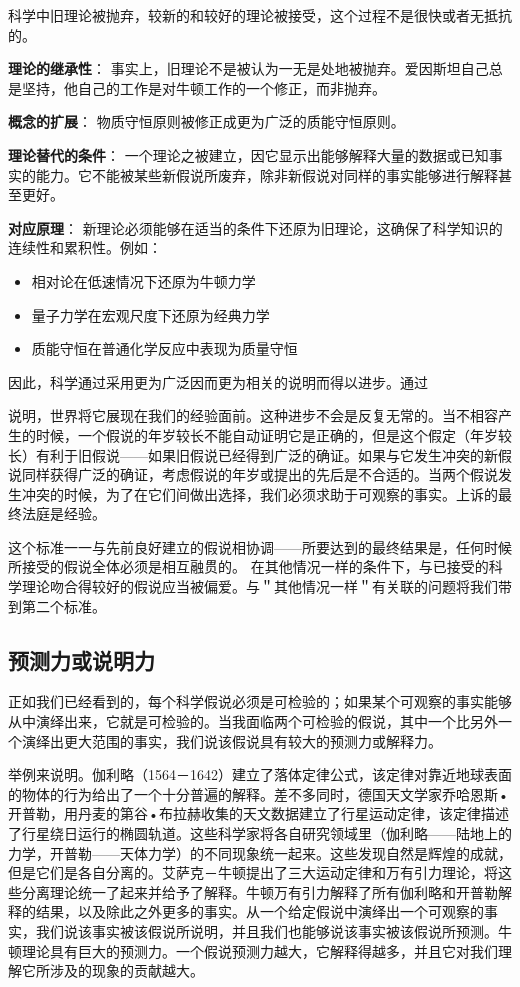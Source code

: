 \begin{theorembox}[title=理论继承与发展的辩证关系]
科学中旧理论被抛弃，较新的和较好的理论被接受，这个过程不是很快或者无抵抗的。

\textbf{理论的继承性}：
事实上，旧理论不是被认为一无是处地被抛弃。爱因斯坦自己总是坚持，他自己的工作是对牛顿工作的一个修正，而非抛弃。

\textbf{概念的扩展}：
物质守恒原则被修正成更为广泛的质能守恒原则。

\textbf{理论替代的条件}：
一个理论之被建立，因它显示出能够解释大量的数据或已知事实的能力。它不能被某些新假说所废弃，除非新假说对同样的事实能够进行解释甚至更好。

\textbf{对应原理}：
新理论必须能够在适当的条件下还原为旧理论，这确保了科学知识的连续性和累积性。例如：
\begin{itemize}
\item 相对论在低速情况下还原为牛顿力学
\item 量子力学在宏观尺度下还原为经典力学
\item 质能守恒在普通化学反应中表现为质量守恒
\end{itemize}
\end{theorembox}

因此，科学通过采用更为广泛因而更为相关的说明而得以进步。通过

说明，世界将它展现在我们的经验面前。这种进步不会是反复无常的。当不相容产生的时候，一个假说的年岁较长不能自动证明它是正确的，但是这个假定（年岁较长）有利于旧假说——如果旧假说已经得到广泛的确证。如果与它发生冲突的新假说同样获得广泛的确证，考虑假说的年岁或提出的先后是不合适的。当两个假说发生冲突的时候，为了在它们间做出选择，我们必须求助于可观察的事实。上诉的最终法庭是经验。

这个标准一一与先前良好建立的假说相协调——所要达到的最终结果是，任何时候所接受的假说全体必须是相互融贯的。\cite{blanshard1939} 在其他情况一样的条件下，与已接受的科学理论吻合得较好的假说应当被偏爱。与＂其他情况一样＂有关联的问题将我们带到第二个标准。

\subsection{预测力或说明力}
正如我们已经看到的，每个科学假说必须是可检验的；如果某个可观察的事实能够从中演绎出来，它就是可检验的。当我面临两个可检验的假说，其中一个比另外一个演绎出更大范围的事实，我们说该假说具有较大的预测力或解释力。

举例来说明。伽利略（1564－1642）建立了落体定律公式，该定律对靠近地球表面的物体的行为给出了一个十分普遍的解释。差不多同时，德国天文学家乔哈恩斯•开普勒，用丹麦的第谷•布拉赫收集的天文数据建立了行星运动定律，该定律描述了行星绕日运行的椭圆轨道。这些科学家将各自研究领域里（伽利略——陆地上的力学，开普勒——天体力学）的不同现象统一起来。这些发现自然是辉煌的成就，但是它们是各自分离的。艾萨克－牛顿提出了三大运动定律和万有引力理论，将这些分离理论统一了起来并给予了解释。牛顿万有引力解释了所有伽利略和开普勒解释的结果，以及除此之外更多的事实。从一个给定假说中演绎出一个可观察的事实，我们说该事实被该假说所说明，并且我们也能够说该事实被该假说所预测。牛顿理论具有巨大的预测力。一个假说预测力越大，它解释得越多，并且它对我们理解它所涉及的现象的贡献越大。\cite{braithwaite1960}

